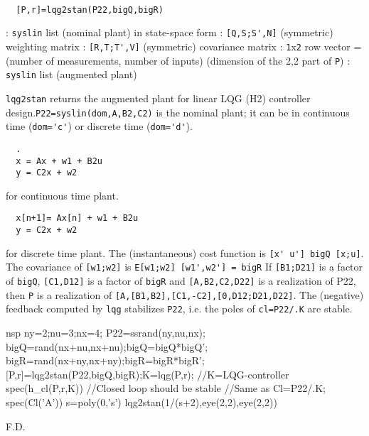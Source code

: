 \begin{mandesc}
   \\ %
\end{mandesc}
\begin{calling_sequence}
\begin{verbatim}
  [P,r]=lqg2stan(P22,bigQ,bigR)  
\end{verbatim}
\end{calling_sequence}
\begin{parameters}
  \begin{varlist}
    : \verb!syslin! list (nominal plant) in state-space form
    : \verb![Q,S;S',N]! (symmetric) weighting matrix
    : \verb![R,T;T',V]! (symmetric) covariance matrix
    : \verb!1!x\verb!2! row vector = (number of measurements, number of inputs)  (dimension of  the 2,2 part of \verb!P!)
    : \verb!syslin! list (augmented plant)
  \end{varlist}
\end{parameters}
\begin{mandescription}
  \verb!lqg2stan!  returns the augmented plant for linear LQG (H2) controller 
  design.\verb!P22=syslin(dom,A,B2,C2)! is the nominal plant; it can be in continuous 
  time (\verb!dom='c'!) or discrete time (\verb!dom='d'!).
\begin{verbatim}
  . 
  x = Ax + w1 + B2u
  y = C2x + w2
\end{verbatim}
for continuous time plant.
\begin{verbatim}
  x[n+1]= Ax[n] + w1 + B2u
  y = C2x + w2
\end{verbatim}
for discrete time plant.
The (instantaneous) cost function is \verb![x' u'] bigQ [x;u]!.
The covariance of \verb![w1;w2]! is \verb!E[w1;w2] [w1',w2'] = bigR!
If \verb![B1;D21]! is a factor of \verb!bigQ!, \verb![C1,D12]!
is a factor of \verb!bigR! and \verb![A,B2,C2,D22]! is
a realization of P22, then \verb!P! is a realization of
\verb![A,[B1,B2],[C1,-C2],[0,D12;D21,D22]!.
  The (negative) feedback computed by \verb!lqg! stabilizes \verb!P22!,
  i.e. the poles of \verb!cl=P22/.K! are stable.
\end{mandescription}
\begin{examples}
  \begin{mintednsp}{nsp}
    ny=2;nu=3;nx=4;
    P22=ssrand(ny,nu,nx);
    bigQ=rand(nx+nu,nx+nu);bigQ=bigQ*bigQ';
    bigR=rand(nx+ny,nx+ny);bigR=bigR*bigR';
    [P,r]=lqg2stan(P22,bigQ,bigR);K=lqg(P,r);  //K=LQG-controller
    spec(h_cl(P,r,K))      //Closed loop should be stable
    //Same as Cl=P22/.K; spec(Cl('A'))
    s=poly(0,'s')
    lqg2stan(1/(s+2),eye(2,2),eye(2,2))
  \end{mintednsp}
\end{examples}
\begin{manseealso}
           
\end{manseealso}
\begin{authors}
  F.D.  
\end{authors}
